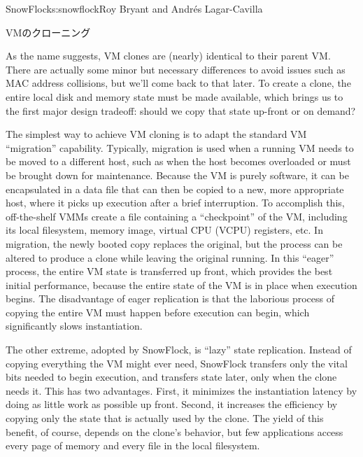 \begin{aosachapter}{SnowFlock}{s:snowflock}{Roy Bryant and Andr\'e{s} Lagar-Cavilla}
\begin{aosasect1}{VMのクローニング}

As the name suggests, VM clones are (nearly) identical to their parent
VM\@. There are actually some minor but necessary differences to avoid
issues such as MAC address collisions, but we'll come back to that
later. To create a clone, the entire local disk and memory state must
be made available, which brings us to the first major design tradeoff:
should we copy that state up-front or on demand?

The simplest way to achieve VM cloning is to adapt the standard VM
``migration'' capability.  Typically, migration is used when a running
VM needs to be moved to a different host, such as when the host
becomes overloaded or must be brought down for maintenance. Because
the VM is purely software, it can be encapsulated in a data file that
can then be copied to a new, more appropriate host, where it picks up
execution after a brief interruption. To accomplish this,
off-the-shelf VMMs create a file containing a ``checkpoint'' of the VM,
including its local filesystem, memory image, virtual CPU (VCPU)
registers, etc. In migration, the newly booted copy replaces the
original, but the process can be altered to produce a clone while
leaving the original running. In this ``eager'' process, the entire VM
state is transferred up front, which provides the best initial
performance, because the entire state of the VM is in place when
execution begins.  The disadvantage of eager replication is that the
laborious process of copying the entire VM must happen before
execution can begin, which significantly slows instantiation.

The other extreme, adopted by SnowFlock, is ``lazy'' state
replication.  Instead of copying everything the VM might ever need,
SnowFlock transfers only the vital bits needed to begin execution, and
transfers state later, only when the clone needs it. This has two
advantages.  First, it minimizes the instantiation latency by doing as
little work as possible up front. Second, it increases the efficiency
by copying only the state that is actually used by the clone. The
yield of this benefit, of course, depends on the clone's behavior, but
few applications access every page of memory and every file in the
local filesystem.


\end{aosasect1}
\end{aosachapter}
